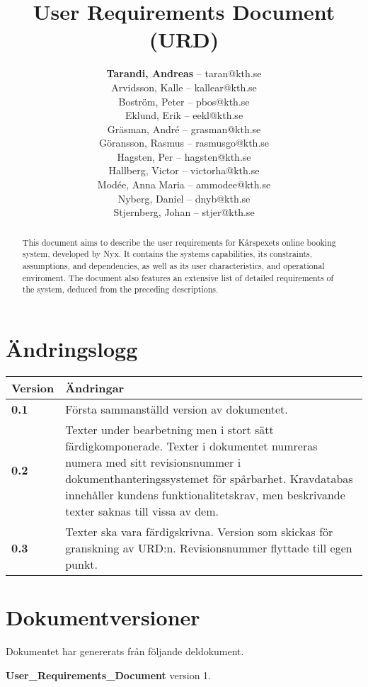 \documentclass[a4paper, twoside, 11pt, titlepage]{article}
\author{
	\small
	\textbf{Tarandi, Andreas} -- taran@kth.se \\
	Arvidsson, Kalle -- kallear@kth.se\\
	Boström, Peter -- pbos@kth.se\\
	Eklund, Erik -- eekl@kth.se\\
	Gräsman, André -- grasman@kth.se\\
	Göransson, Rasmus -- rasmusgo@kth.se\\
	Hagsten, Per -- hagsten@kth.se\\
	Hallberg, Victor -- victorha@kth.se\\
	Modée, Anna Maria -- ammodee@kth.se\\
	Nyberg, Daniel -- dnyb@kth.se\\
	Stjernberg, Johan -- stjer@kth.se
	}
\title{User Requirements Document (URD)}
\begin{document}
\maketitle

\begin{abstract}
	This document aims to describe the user requirements for Kårspexets online booking system, developed by Nyx. It contains the systems capabilities, its constraints, assumptions, and dependencies, as well as its user characteristics, and operational enviroment. The document also features an extensive list of detailed requirements of the system, deduced from the preceding descriptions.
\end{abstract}

\newpage

\tableofcontents

\clearpage
\setcounter{page}{1}

\startfooter

\clearpage
	\section*{Ändringslogg}


\begin{tabular} { | p{3cm} | p{12.2cm} | }
	\hline
	\textbf{Version} & \textbf{Ändringar } \\
	\hline
	\textbf{0.1} & Första sammanställd version av dokumentet.  \\
	\hline
	\textbf{0.2} & Texter under bearbetning men i stort sätt färdigkomponerade. Texter i dokumentet numreras numera med sitt revisionsnummer i dokumenthanteringssystemet för spårbarhet. Kravdatabas innehåller kundens funktionalitetskrav, men beskrivande texter saknas till vissa av dem.   \\
	\hline
	\textbf{0.3} & Texter ska vara färdigskrivna. Version som skickas för granskning av URD:n. Revisionsnummer flyttade till egen punkt.  \\
	\hline
\end{tabular}


\clearpage
	\section*{Dokumentversioner}


Dokumentet har genererats från följande deldokument.

\textbf{User\_Requirements\_Document} version 1.
\end{document}

